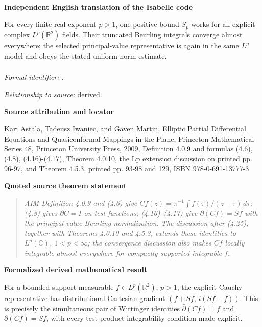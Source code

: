 \documentclass[10pt,oneside]{article}
\newenvironment{sourcequote}{\begin{quote}\itshape}{\end{quote}}
\newcommand{\reviewlabel}[1]{\par\smallskip\noindent\textsf{\bfseries #1}\par\smallskip}
\begin{document}
\reviewlabel{Independent English translation of the Isabelle code}
For every finite real exponent $p>1$, one positive bound $S_p$ works for all explicit complex $L^p(\mathbb R^2)$ fields. Their truncated Beurling integrals converge almost everywhere; the selected principal-value representative is again in the same $L^p$ model and obeys the stated uniform norm estimate.

\subsubsection{\texttt{}}
\noindent\textit{Formal identifier:} \texttt{}.\par
\noindent\textit{Relationship to source:} derived.

\reviewlabel{Source attribution and locator}
Kari Astala, Tadeusz Iwaniec, and Gaven Martin, Elliptic Partial Differential Equations and Quasiconformal Mappings in the Plane, Princeton Mathematical Series 48, Princeton University Press, 2009, Definition 4.0.9 and formulas (4.6), (4.8), (4.16)-(4.17), Theorem 4.0.10, the Lp extension discussion on printed pp. 96-97, and Theorem 4.5.3, printed pp. 93-98 and 129, ISBN 978-0-691-13777-3

\reviewlabel{Quoted source theorem statement}
\begin{sourcequote}
AIM Definition 4.0.9 and (4.6) give $Cf(z)=\pi^{-1}\int f(\tau)/(z-\tau)\,d\tau$; (4.8) gives $\bar\partial C=I$ on test functions; (4.16)--(4.17) give $\partial(Cf)=Sf$ with the principal-value Beurling normalization. The discussion after (4.25), together with Theorems 4.0.10 and 4.5.3, extends these identities to $L^p(\mathbb C)$, $1<p<\infty$; the convergence discussion also makes $Cf$ locally integrable almost everywhere for compactly supported integrable $f$.
\end{sourcequote}

\reviewlabel{Formalized derived mathematical result}
For a bounded-support measurable $f\in L^p(\mathbb R^2)$, $p>1$, the explicit Cauchy representative has distributional Cartesian gradient $(f+Sf,\, i(Sf-f))$. This is precisely the simultaneous pair of Wirtinger identities $\bar\partial(Cf)=f$ and $\partial(Cf)=Sf$, with every test-product integrability condition made explicit.
\end{document}
